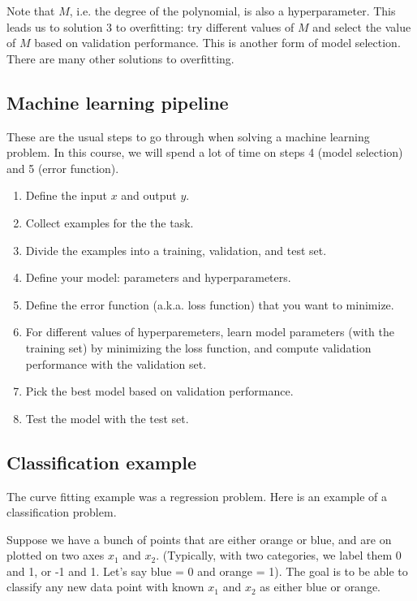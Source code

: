 \documentclass[a4paper,12pt]{article}
\begin{document}
Note that $M$, i.e. the degree of the polynomial, is also a hyperparameter. This leads us to solution 3 to overfitting: try different values of $M$ and select the value of $M$ based on validation performance. This is another form of model selection. There are many other solutions to overfitting. 

\subsection{Machine learning pipeline}

These are the usual steps to go through when solving a machine learning problem. In this course, we will spend a lot of time on steps 4 (model selection) and 5 (error function). 

\begin{enumerate}
\item Define the input $x$ and output $y$. 
\item Collect examples for the the task. 
\item Divide the examples into a training, validation, and test set. 
\item Define your model: parameters and hyperparameters. 
\item Define the error function (a.k.a. loss function) that you want to minimize. 
\item For different values of hyperparemeters, learn model parameters (with the training set) by minimizing the loss function, and compute validation performance with the validation set. 
\item Pick the best model based on validation performance. 
\item Test the model with the test set. 
\end{enumerate}

\subsection{Classification example}

The curve fitting example was a regression problem. Here is an example of a classification problem. 

Suppose we have a bunch of points that are either orange or blue, and are on plotted on two axes $x_1$ and $x_2$. (Typically, with two categories, we label them 0 and 1, or -1 and 1. Let's say blue = 0 and orange = 1). The goal is to be able to classify any new data point with known $x_1$ and $x_2$ as either blue or orange. 
\end{document}
